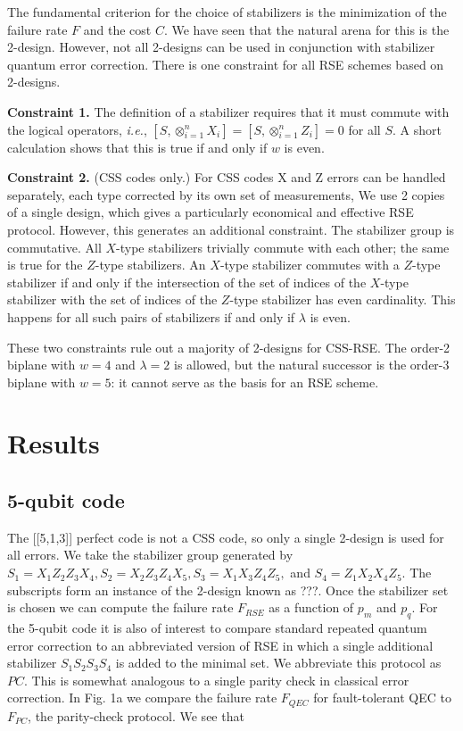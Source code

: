 \documentclass[reprint, superscriptaddress]{revtex4-1}
\numberwithin{equation}{section}
\numberwithin{figure}{section}
\numberwithin{table}{section}
\begin{document}
The fundamental criterion for the choice of stabilizers is the minimization of the failure rate $F$ and the cost $C$.  We have seen that the natural arena for this is the 2-design.  However, not all 2-designs can be used in conjunction with stabilizer quantum error correction.  There is one constraint for all RSE schemes based on 2-designs.

\textbf{Constraint 1.}
The definition of a stabilizer requires that it must commute with the logical operators, \textit{i.e.}, $[S, \otimes_{i=1}^{n}X_i] = [S, \otimes_{i=1}^{n}Z_i]=0$ for all $S$.  A short calculation shows that this is true if and only if $w$ is even.

\textbf{Constraint 2.}
(CSS codes only.)  For CSS codes X and Z errors can be handled separately, each type corrected by its own set of measurements, We use 2 copies of a single design, which gives a particularly economical and effective RSE protocol.  However, this generates an additional constraint. The stabilizer group is commutative.  All $X$-type stabilizers trivially commute with each other; the same is true for the $Z$-type stabilizers.  An $X$-type stabilizer commutes with a $Z$-type stabilizer if and only if the intersection of the set of indices of the $X$-type stabilizer with the set of indices of the $Z$-type stabilizer has even cardinality.  This happens for all such pairs of stabilizers if and only if $\lambda$ is even. 

These two constraints rule out a majority of 2-designs for CSS-RSE.  The order-2 biplane with $w=4$ and $\lambda=2$ is allowed, but the natural successor is the order-3 biplane with $w=5$: it cannot serve as the basis for an RSE scheme.   


\section{Results}

\subsection{5-qubit code}

The [[5,1,3]] perfect code is not a CSS code, so only a single 2-design is used for all errors.  We take the stabilizer group generated by $S_1 = X_1 Z_2 Z_3 X_4, S_2 = X_2 Z_3 Z_4 X_5, S_3 = X_1 X_3 Z_4 Z_5,$ and $S_4 = Z_1 X_2 X_4 Z_5$. The subscripts form an instance of the 2-design known as  ???.  Once the stabilizer set is chosen we can compute the failure rate $F_{RSE}$ as a function of $p_m$ and $p_q$.  For the 5-qubit code it is also of interest to compare standard repeated quantum error correction to an abbreviated version of RSE in which a single additional stabilizer  
$ S_1 S_2 S_3 S_4$ is added to the minimal set.  We abbreviate this protocol as $PC$. This is somewhat analogous to a single parity check in classical error correction.   
In Fig. 1a we compare the failure rate $F_{QEC}$ for fault-tolerant QEC to $F_{PC}$, the parity-check protocol.  We see that             
\end{document}
